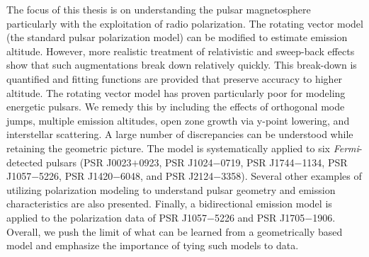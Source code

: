 
The focus of this thesis is on understanding the pulsar magnetosphere particularly
with the exploitation of radio polarization.  
The rotating vector model (the standard pulsar polarization
model) can be modified to estimate emission altitude.  However, more
realistic treatment of relativistic and sweep-back effects show that such
augmentations break down relatively quickly. This break-down is quantified and
fitting functions are provided that preserve accuracy to higher altitude.  The
rotating vector model has proven particularly poor for modeling energetic
pulsars.  We remedy this by including the effects of orthogonal mode jumps,
multiple emission altitudes, open zone growth via y-point lowering, and
interstellar scattering.  A large number of discrepancies can be
understood while retaining the geometric picture.  The model is systematically applied to six
{\it Fermi}-detected pulsars (PSR J0023$+$0923, PSR J1024$-$0719, PSR J1744$-$1134,
PSR J1057$-$5226, PSR J1420$-$6048, and PSR J2124$-$3358).
Several other examples of utilizing polarization modeling to understand
pulsar geometry and emission characteristics are also presented.
Finally, a
bidirectional emission model is applied to the polarization data of PSR J1057$-$5226
and PSR J1705$-$1906.  
Overall, we push the limit of what
can be learned from a geometrically based model and emphasize the importance of
tying such models to data.  

